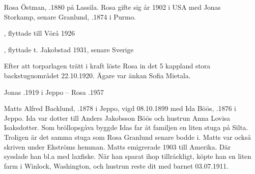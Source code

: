 Rosa Östman, .1880 på Lassila. Rosa gifte sig år 1902 i USA med Jonas Storkamp, senare Granlund,  .1874 i Purmo.
\begin{jhchildren}
  \item {}, flyttade till Vörå 1926
  \item {}
  \item {}
  \item {}
  \item {}, flyttade t. Jakobstad 1931, senare Sverige
\end{jhchildren}
Efter att torparlagen trätt i kraft löste Rosa in det 5 kappland stora backstuguområdet 22.10.1920. Ägare var änkan Sofia Mietala.

Jonas .1919 i Jeppo  -- 	Rosa .1957


Matts Alfred Backlund, .1878 i Jeppo, vigd 08.10.1899 med Ida Böös, .1876 i Jeppo. Ida var dotter till Anders Jakobsson Böös och hustrun Anna Lovisa Isaksdotter. Som bröllopsgåva byggde Idas far åt familjen en liten stuga på Silta. Troligen är det samma stuga som Rosa Granlund senare bodde i. Matts var också skriven under Ekströms hemman. Matts emigrerade 1903 till Amerika. Där sysslade han bl.a med laxfiske. När han sparat ihop tillräckligt, köpte han en liten farm i Winlock, Washington, och hustrun reste dit med barnet 03.07.1911.
\begin{jhchildren}
  \item {}
  \item {}
  \item {}
  \item {}
  \item {}
\end{jhchildren}




